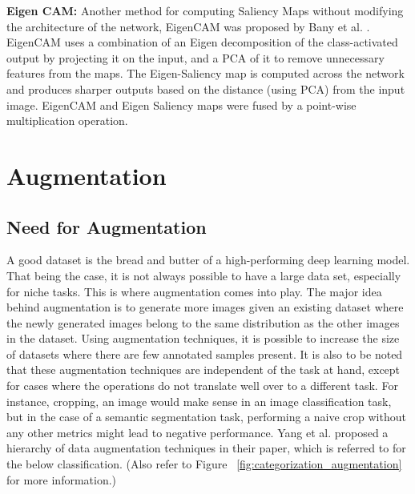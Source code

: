 \documentclass[a4paper,11pt,openright]{book}
\begin{document}
\textbf{Eigen CAM: } Another method for computing Saliency Maps without modifying the architecture of the network, EigenCAM was proposed by Bany et al. \cite{banymuhammadEigenCAMVisualExplanations2021}. EigenCAM uses a combination of an Eigen decomposition of the class-activated output by projecting it on the input, and a PCA of it to remove unnecessary features from the maps. The Eigen-Saliency map is computed across the network and produces sharper outputs based on the distance (using PCA) from the input image. EigenCAM and Eigen Saliency maps were fused by a point-wise multiplication operation.

\section{Augmentation} \label{sec:augmentation}
\subsection{Need for Augmentation}

A good dataset is the bread and butter of a high-performing deep learning model. That being the case, it is not always possible to have a large data set, especially for niche tasks. This is where augmentation comes into play. The major idea behind augmentation is to generate more images given an existing dataset where the newly generated images belong to the same distribution as the other images in the dataset. Using augmentation techniques, it is possible to increase the size of datasets where there are few annotated samples present. It is also to be noted that these augmentation techniques are independent of the task at hand, except for cases where the operations do not translate well over to a different task. For instance, cropping, an image would make sense in an image classification task, but in the case of a semantic segmentation task, performing a naive crop without any other metrics might lead to negative performance. Yang et al. \cite{yangImageDataAugmentation2022} proposed a hierarchy of data augmentation techniques in their paper, which is referred to for the below classification. (Also refer to Figure ~\ref{fig:categorization_augmentation} for more information.)
\end{document}
